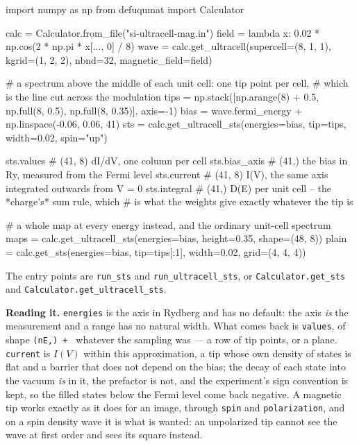 \documentclass[11pt,a4paper]{article}
\newcommand{\code}[1]{\texttt{\small #1}}
\begin{document}
\begin{pycode}
import numpy as np
from defuqumat import Calculator

calc = Calculator.from_file("si-ultracell-mag.in")
field = lambda x: 0.02 * np.cos(2 * np.pi * x[..., 0] / 8)
wave = calc.get_ultracell(supercell=(8, 1, 1), kgrid=(1, 2, 2), nbnd=32,
                          magnetic_field=field)

# a spectrum above the middle of each unit cell: one tip point per cell,
# which is the line cut across the modulation
tips = np.stack([np.arange(8) + 0.5, np.full(8, 0.5), np.full(8, 0.35)], axis=-1)
bias = wave.fermi_energy + np.linspace(-0.06, 0.06, 41)
sts = calc.get_ultracell_sts(energies=bias, tip=tips, width=0.02, spin="up")

sts.values        # (41, 8) dI/dV, one column per cell
sts.bias_axis     # (41,) the bias in Ry, measured from the Fermi level
sts.current       # (41, 8) I(V), the same axis integrated outwards from V = 0
sts.integral      # (41,) D(E) per unit cell -- the *charge's* sum rule, which
                  # is what the weights give exactly whatever the tip is

# a whole map at every energy instead, and the ordinary unit-cell spectrum
maps = calc.get_ultracell_sts(energies=bias, height=0.35, shape=(48, 8))
plain = calc.get_sts(energies=bias, tip=tips[:1], width=0.02, grid=(4, 4, 4))
\end{pycode}

The entry points are \code{run\_sts} and \code{run\_ultracell\_sts}, or
\code{Calculator.get\_sts} and \code{Calculator.get\_ultracell\_sts}.

\textbf{Reading it.} \code{energies} is the axis in Rydberg and has no default:
the axis \emph{is} the measurement and a range has no natural width. What comes
back is \code{values}, of shape \code{(nE,) + } whatever the sampling was --- a
row of tip points, or a plane. \code{current} is $I(V)$ within this
approximation, a tip whose own density of states is flat and a barrier that does
not depend on the bias; the decay of each state into the vacuum \emph{is} in it,
the prefactor is not, and the experiment's sign convention is kept, so the filled
states below the Fermi level come back negative. A magnetic tip works exactly as
it does for an image, through \code{spin} and \code{polarization}, and on a spin
density wave it is what is wanted: an unpolarized tip cannot see the wave at
first order and sees its square instead.
\end{document}
